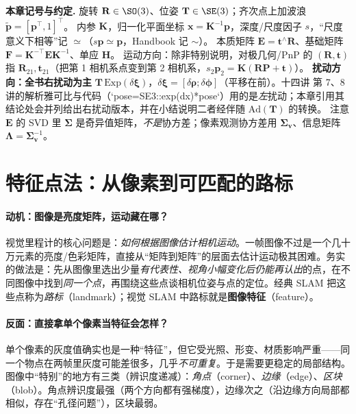 \begin{note}
\textbf{本章记号与约定.}\;
旋转 $\mathbf{R}\in\SO(3)$、位姿 $\mathbf{T}\in\SE(3)$；齐次点上加波浪 $\tilde{\mathbf{p}}=[\mathbf{p}^\top,1]^\top$。
内参 $\mathbf{K}$，归一化平面坐标 $\mathbf{x}=\mathbf{K}^{-1}\mathbf{p}$，深度/尺度因子 $s$，“尺度意义下相等”记 $\simeq$（$s\mathbf{p}\simeq\mathbf{p}$，Handbook\cite{carlone2026handbook} 记 $\sim$）。
本质矩阵 $\mathbf{E}=\mathbf{t}^\wedge\mathbf{R}$、基础矩阵 $\mathbf{F}=\mathbf{K}^{-\top}\mathbf{E}\mathbf{K}^{-1}$、单应 $\mathbf{H}$。
运动方向：除非特别说明，对极几何/PnP 的 $(\mathbf{R},\mathbf{t})$ 指 $\mathbf{R}_{21},\mathbf{t}_{21}$（把第 1 相机系点变到第 2 相机系，$s_2\mathbf{p}_2=\mathbf{K}(\mathbf{R}\mathbf{P}+\mathbf{t})$）。
\textbf{扰动方向：全书右扰动为主} $\mathbf{T}\,\mathrm{Exp}(\delta\boldsymbol{\xi})$，$\delta\boldsymbol{\xi}=[\delta\boldsymbol{\rho};\delta\boldsymbol{\phi}]$（平移在前）。十四讲\cite{gaoxiang2019slam14} 第 7、8 讲的解析雅可比与代码（`pose=SE3::exp(dx)*pose`）用的是\emph{左}扰动；本章引用其结论处会并列给出右扰动版本，并在小结说明二者经伴随 $\mathrm{Ad}(\mathbf{T})$ 的转换。
注意 $\mathbf{E}$ 的 SVD 里 $\boldsymbol{\Sigma}$ 是奇异值矩阵，\emph{不是}协方差；像素观测协方差用 $\boldsymbol{\Sigma}_{\mathbf v}$、信息矩阵 $\boldsymbol{\Lambda}=\boldsymbol{\Sigma}_{\mathbf v}^{-1}$。
\end{note}

\section{特征点法：从像素到可匹配的路标}
\label{sec:vo-feature}

\paragraph{动机：图像是亮度矩阵，运动藏在哪？}
视觉里程计的核心问题是：\emph{如何根据图像估计相机运动}\cite{gaoxiang2019slam14}。一帧图像不过是一个几十万元素的亮度/色彩矩阵，直接从“矩阵到矩阵”的层面去估计运动极其困难。务实的做法是：先从图像里选出少量\emph{有代表性、视角小幅变化后仍能再认出}的点，在不同图像中找到\emph{同一个点}，再围绕这些点谈相机位姿与点的定位。经典 SLAM 把这些点称为\emph{路标}（landmark）；视觉 SLAM 中路标就是\textbf{图像特征}（feature）。

\paragraph{反面：直接拿单个像素当特征会怎样？}
单个像素的灰度值确实也是一种“特征”，但它受光照、形变、材质影响严重——同一个物点在两帧里灰度可能差很多，几乎\emph{不可重复}。于是需要更稳定的局部结构。图像中“特别”的地方有三类（辨识度递减）：\emph{角点}（corner）、\emph{边缘}（edge）、\emph{区块}（blob）。角点辨识度最强（两个方向都有强梯度），边缘次之（沿边缘方向局部都相似，存在“孔径问题”），区块最弱。

